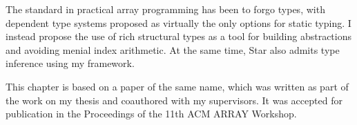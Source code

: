 The standard in practical array programming has been to forgo types, with dependent type systems proposed as virtually the only options for static typing. I instead propose the use of rich structural types as a tool for building abstractions and avoiding menial index arithmetic. At the same time, Star also admits type inference using my framework.

This chapter is based on a paper of the same name, which was written as part of the work on my thesis and coauthored with my supervisors. It was accepted for publication in the Proceedings of the 11th ACM ARRAY Workshop. 